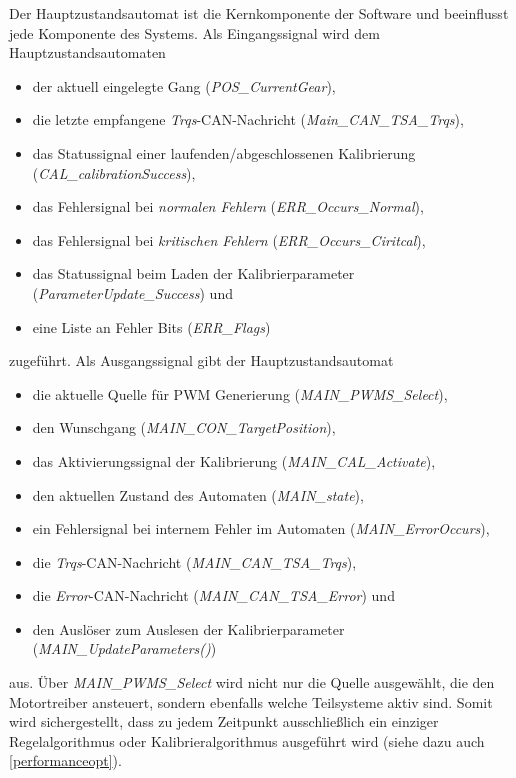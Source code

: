 Der Hauptzustandsautomat ist die Kernkomponente der Software und beeinflusst jede Komponente des Systems. Als Eingangssignal wird dem Hauptzustandsautomaten
\begin{itemize}
	\item der aktuell eingelegte Gang (\textit{POS\_CurrentGear}),
	\item die letzte empfangene \textit{Trqs}-CAN-Nachricht (\textit{Main\_CAN\_TSA\_Trqs}),
	\item das Statussignal einer laufenden/abgeschlossenen Kalibrierung (\textit{CAL\_calibrationSuccess}),
	\item das Fehlersignal bei \textit{normalen Fehlern} (\textit{ERR\_Occurs\_Normal}),
	\item das Fehlersignal bei \textit{kritischen Fehlern} (\textit{ERR\_Occurs\_Ciritcal}),
	\item das Statussignal beim Laden der Kalibrierparameter (\textit{ParameterUpdate\_Success}) und
	\item eine Liste an Fehler Bits (\textit{ERR\_Flags})
\end{itemize}
zugeführt. Als Ausgangssignal gibt der Hauptzustandsautomat
\begin{itemize}
	\item die aktuelle Quelle für PWM Generierung (\textit{MAIN\_PWMS\_Select}),
	\item den Wunschgang (\textit{MAIN\_CON\_TargetPosition}),
	\item das Aktivierungssignal der Kalibrierung  (\textit{MAIN\_CAL\_Activate}),
	\item den aktuellen Zustand des Automaten  (\textit{MAIN\_state}),
	\item ein Fehlersignal bei internem Fehler im Automaten  (\textit{MAIN\_ErrorOccurs}),
	\item die \textit{Trqs}-CAN-Nachricht  (\textit{MAIN\_CAN\_TSA\_Trqs}),
	\item die \textit{Error}-CAN-Nachricht  (\textit{MAIN\_CAN\_TSA\_Error}) und
	\item den Auslöser zum Auslesen der Kalibrierparameter  (\textit{MAIN\_UpdateParameters()})
\end{itemize}
aus. Über \textit{MAIN\_PWMS\_Select} wird nicht nur die Quelle ausgewählt, die den Motortreiber ansteuert, sondern ebenfalls welche Teilsysteme aktiv sind. Somit wird sichergestellt, dass zu jedem Zeitpunkt ausschließlich ein einziger Regelalgorithmus oder Kalibrieralgorithmus ausgeführt wird (siehe dazu auch \autoref{performanceopt}).\\
